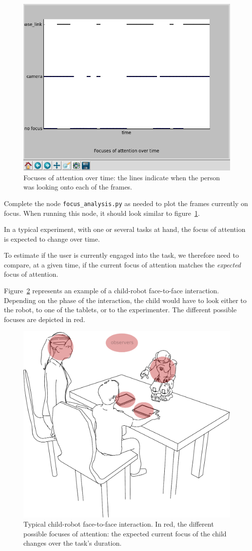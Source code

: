 \documentclass{instructions}
\begin{document}
\begin{figure}[h!]
    \centering
    \includegraphics[width=0.6\linewidth]{figs/fov_plot}
    \caption{Focuses of attention over time: the lines indicate when the person
    was looking onto each of the frames.}
    \label{plot_focus}
\end{figure}

Complete the node {\tt focus\_analysis.py} as needed to plot the frames currently
on focus. When running this node, it should look similar to figure~\ref{plot_focus}.



In a typical experiment, with one or several tasks at hand, the focus of
attention is expected to change over time.

To estimate if the user is currently engaged into the task, we therefore need to
compare, at a given time, if the current focus of attention matches the {\it
expected} focus of attention.

Figure~\ref{focuses} represents an example of a child-robot face-to-face
interaction. Depending on the phase of the interaction, the child would have to
look either to the robot, to one of the tablets, or to the experimenter. The
different possible focuses are depicted in red.

\begin{figure} [h!]
    \centering
    \includegraphics[width=0.7\linewidth]{figs/cowriter_setup}
    \caption{Typical child-robot face-to-face interaction. In red, the different
    possible focuses of attention: the expected current focus of the child
    changes over the task's duration.}
    \label{focuses}
\end{figure}
\end{document}

